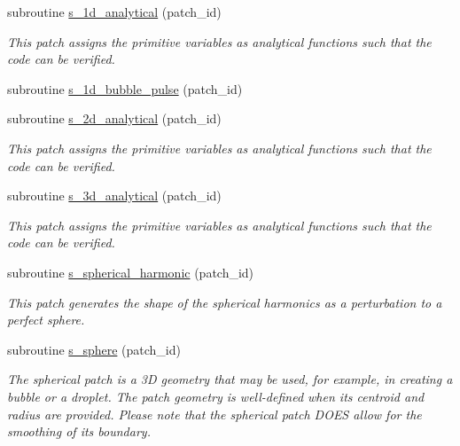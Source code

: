 \begin{DoxyCompactItemize}
subroutine \hyperlink{namespacem__initial__condition_a3b4fe978231e74b699695a35fb544236}{s\+\_\+1d\+\_\+analytical} (patch\+\_\+id)
\begin{DoxyCompactList}\small\item\em This patch assigns the primitive variables as analytical functions such that the code can be verified. \end{DoxyCompactList}\item 
subroutine \hyperlink{namespacem__initial__condition_a7685befab45f10089fc46907fa4cc049}{s\+\_\+1d\+\_\+bubble\+\_\+pulse} (patch\+\_\+id)
\item 
subroutine \hyperlink{namespacem__initial__condition_a50f5727753c025d26925640a19259102}{s\+\_\+2d\+\_\+analytical} (patch\+\_\+id)
\begin{DoxyCompactList}\small\item\em This patch assigns the primitive variables as analytical functions such that the code can be verified. \end{DoxyCompactList}\item 
subroutine \hyperlink{namespacem__initial__condition_abb87c531b4d42302dd22863b95a7cdb2}{s\+\_\+3d\+\_\+analytical} (patch\+\_\+id)
\begin{DoxyCompactList}\small\item\em This patch assigns the primitive variables as analytical functions such that the code can be verified. \end{DoxyCompactList}\item 
subroutine \hyperlink{namespacem__initial__condition_af17f90ba4a3878feb6e38bc8d66cb950}{s\+\_\+spherical\+\_\+harmonic} (patch\+\_\+id)
\begin{DoxyCompactList}\small\item\em This patch generates the shape of the spherical harmonics as a perturbation to a perfect sphere. \end{DoxyCompactList}\item 
subroutine \hyperlink{namespacem__initial__condition_a9037159f591341d05fa5fb23fe82bc2c}{s\+\_\+sphere} (patch\+\_\+id)
\begin{DoxyCompactList}\small\item\em The spherical patch is a 3D geometry that may be used, for example, in creating a bubble or a droplet. The patch geometry is well-\/defined when its centroid and radius are provided. Please note that the spherical patch D\+O\+ES allow for the smoothing of its boundary. \end{DoxyCompactList}\item 

\end{DoxyCompactItemize}
